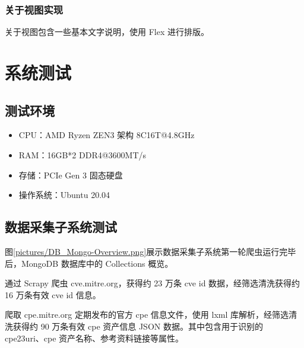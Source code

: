\documentclass[a4paper,AutoFakeBold,oneside,12pt]{book}
\begin{document}


\subsection{关于视图实现}

关于视图包含一些基本文字说明，使用 Flex 进行排版。

\chapter{系统测试}

\section{测试环境}

\begin{itemize}
	\item CPU：AMD Ryzen ZEN3 架构 8C16T@4.8GHz
	\item RAM：16GB*2 DDR4@3600MT/s
	\item 存储：PCIe Gen 3 固态硬盘
	\item 操作系统：Ubuntu 20.04
\end{itemize}

\section{数据采集子系统测试}

图\ref{pictures/DB_Mongo-Overview.png}展示数据采集子系统第一轮爬虫运行完毕后，MongoDB 数据库中的 Collections 概览。


通过 Scrapy 爬虫 cve.mitre.org，获得约 23 万条 cve id 数据，经筛选清洗获得约 16 万条有效 cve id 信息。%


爬取 cpe.mitre.org 定期发布的官方 cpe 信息文件，使用 lxml 库解析，经筛选清洗获得约 90 万条有效 cpe 资产信息 JSON 数据。其中包含用于识别的 cpe23uri、cpe 资产名称、参考资料链接等属性。%
\end{document}

